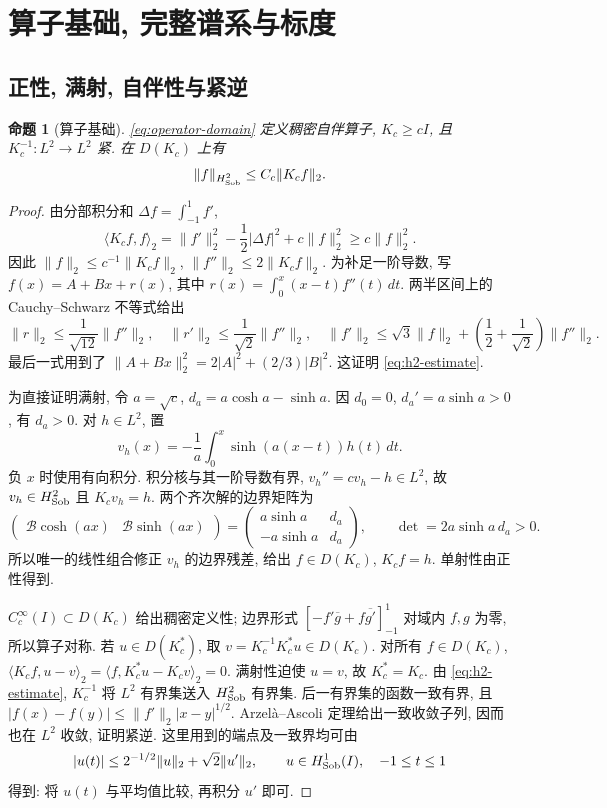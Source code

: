 \documentclass[UTF8]{ctexart}
\newtheorem{proposition}[theorem]{命题}
\begin{document}
\section{算子基础, 完整谱系与标度}
\subsection{正性, 满射, 自伴性与紧逆}
\begin{proposition}[算子基础]\label{prop:operator}
\eqref{eq:operator-domain} 定义稠密自伴算子, $K_c\ge cI$,
且 $K_c^{-1}:L^2\to L^2$ 紧. 在 $D(K_c)$ 上有
\begin{equation}\label{eq:h2-estimate}
 \|f\|_{H^2_{\rm Sob}}\le C_c\|K_cf\|_2.
\end{equation}
\end{proposition}
\begin{proof}
由分部积分和 $\Delta f=\int_{-1}^1f'$,
\[
 \langle K_cf,f\rangle_2
 =\|f'\|_2^2-\frac12|\Delta f|^2+c\|f\|_2^2
 \ge c\|f\|_2^2.
\]
因此 $\|f\|_2\le c^{-1}\|K_cf\|_2$,
$\|f''\|_2\le2\|K_cf\|_2$. 为补足一阶导数, 写
$f(x)=A+Bx+r(x)$, 其中 $r(x)=\int_0^x(x-t)f''(t)\,dt$.
两半区间上的 Cauchy--Schwarz 不等式给出
\[
 \|r\|_2\le\frac1{\sqrt{12}}\|f''\|_2,\quad
 \|r'\|_2\le\frac1{\sqrt2}\|f''\|_2,\quad
 \|f'\|_2\le\sqrt3\|f\|_2+
 \left(\frac12+\frac1{\sqrt2}\right)\|f''\|_2.
\]
最后一式用到了 $\|A+Bx\|_2^2=2|A|^2+(2/3)|B|^2$.
这证明 \eqref{eq:h2-estimate}.

为直接证明满射, 令 $a=\sqrt c$, $d_a=a\cosh a-\sinh a$.
因 $d_0=0$, $d_a'=a\sinh a>0$, 有 $d_a>0$. 对 $h\in L^2$, 置
\[
 v_h(x)=-\frac1a\int_0^x\sinh(a(x-t))h(t)\,dt.
\]
负 $x$ 时使用有向积分. 积分核与其一阶导数有界,
$v_h''=cv_h-h\in L^2$, 故 $v_h\in H^2_{\rm Sob}$ 且 $K_cv_h=h$.
两个齐次解的边界矩阵为
\[
 \begin{pmatrix}\mathcal B\cosh(ax)&\mathcal B\sinh(ax)\end{pmatrix}
 =\begin{pmatrix}a\sinh a&d_a\\-a\sinh a&d_a\end{pmatrix},
 \qquad\det=2a\sinh a\,d_a>0.
\]
所以唯一的线性组合修正 $v_h$ 的边界残差, 给出 $f\in D(K_c)$,
$K_cf=h$. 单射性由正性得到.

$C_c^\infty(I)\subset D(K_c)$ 给出稠密定义性;
边界形式 $[-f'\overline g+f\overline{g'}]_{-1}^1$ 对域内 $f,g$ 为零,
所以算子对称. 若 $u\in D(K_c^*)$, 取 $v=K_c^{-1}K_c^*u\in D(K_c)$.
对所有 $f\in D(K_c)$,
$\langle K_cf,u-v\rangle_2=\langle f,K_c^*u-K_cv\rangle_2=0$.
满射性迫使 $u=v$, 故 $K_c^*=K_c$.
由 \eqref{eq:h2-estimate}, $K_c^{-1}$ 将 $L^2$ 有界集送入 $H^2_{\rm Sob}$ 有界集.
后一有界集的函数一致有界, 且
$|f(x)-f(y)|\le\|f'\|_2|x-y|^{1/2}$.
Arzelà--Ascoli 定理给出一致收敛子列, 因而也在 $L^2$ 收敛, 证明紧逆.
这里用到的端点及一致界均可由
\begin{equation}\label{eq:trace-bound}
 |u(t)|\le2^{-1/2}\|u\|_2+\sqrt2\|u'\|_2,\qquad
 u\in H^1_{\rm Sob}(I),\quad -1\le t\le1
\end{equation}
得到: 将 $u(t)$ 与平均值比较, 再积分 $u'$ 即可.
\end{proof}
\end{document}
